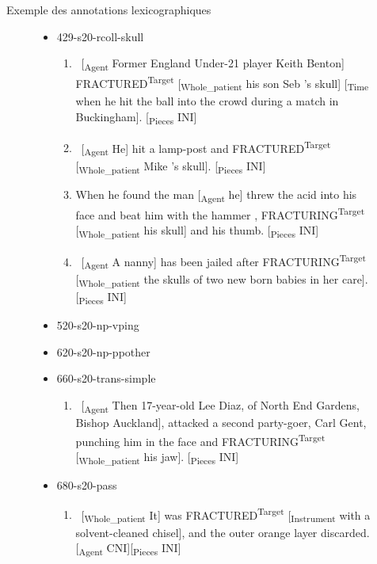 \documentclass{KodeBook}
\begin{document}
Exemple des annotations lexicographiques
\begin{figure}
	\tiny\bfseries
	
	\begin{itemize}
		\item 429-s20-rcoll-skull
		\begin{enumerate}\tiny
			\item \ [\textsubscript{\color{red}Agent} Former England Under-21 player Keith Benton] FRACTURED\textsuperscript{\color{red}Target} [\textsubscript{\color{red}Whole\_patient} his son Seb 's skull] [\textsubscript{\color{red}Time} when he hit the ball into the crowd during a match in Buckingham]. [\textsubscript{\color{red}Pieces} INI] 
			\item \ [\textsubscript{\color{red}Agent} He] hit a lamp-post and FRACTURED\textsuperscript{\color{red}Target} [\textsubscript{\color{red}Whole\_patient} Mike 's skull]. [\textsubscript{\color{red}Pieces} INI] 
			\item When he found the man [\textsubscript{\color{red}Agent} he] threw the acid into his face and beat him with the hammer , FRACTURING\textsuperscript{\color{red}Target} [\textsubscript{\color{red}Whole\_patient} his skull] and his thumb. [\textsubscript{\color{red}Pieces} INI] 
			\item \ [\textsubscript{\color{red}Agent} A nanny] has been jailed after FRACTURING\textsuperscript{\color{red}Target} [\textsubscript{\color{red}Whole\_patient} the skulls of two new born babies in her care]. [\textsubscript{\color{red}Pieces} INI] 
		\end{enumerate}
		\item 520-s20-np-vping
		\item 620-s20-np-ppother
		\item 660-s20-trans-simple
		\begin{enumerate}\tiny
			\item \ [\textsubscript{\color{red}Agent} Then 17-year-old Lee Diaz, of North End Gardens, Bishop Auckland], attacked a second party-goer, Carl Gent, punching him in the face and FRACTURING\textsuperscript{\color{red}Target} [\textsubscript{\color{red}Whole\_patient} his jaw]. [\textsubscript{\color{red}Pieces} INI] 
		\end{enumerate}
		
		\item 680-s20-pass
		\begin{enumerate}\tiny
			\item \ [\textsubscript{\color{red}Whole\_patient} It] was FRACTURED\textsuperscript{\color{red}Target} [\textsubscript{\color{red}Instrument} with a solvent-cleaned chisel], and the outer orange layer discarded. [\textsubscript{\color{red}Agent} CNI][\textsubscript{\color{red}Pieces} INI] 
		\end{enumerate}
		

\end{itemize}
\end{figure}
\end{document}
